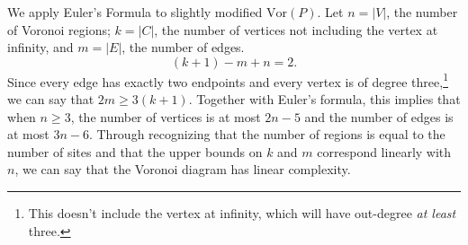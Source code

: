 \documentclass[12pt,twoside]{reedthesis}
\begin{document}
      We apply Euler's Formula to slightly modified $\mbox{Vor}(P)$. Let $n = |V|$, the number of Voronoi regions; $k = |C|$, the number of vertices not including the vertex at infinity, and $m = |E|$, the number of edges.
      $$(k + 1) - m + n = 2.$$ 
      Since every edge has exactly two endpoints and every vertex is of degree three,\footnote{This doesn't include the vertex at infinity, which will have out-degree \emph{at least} three.} we can say that $2m \geq 3(k + 1)$. Together with Euler's formula, this implies that when $n\geq 3$, the number of vertices is at most $2n-5$ and the number of edges is at most $3n-6$. Through recognizing that the number of regions is equal to the number of sites and that the upper bounds on $k$ and $m$ correspond linearly with $n$, we can say that the Voronoi diagram has linear complexity. 


    


\end{document}
